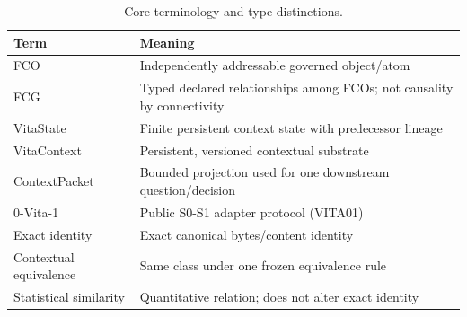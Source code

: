 \begin{table}[t]
\centering
\small
\begin{tabular}{ll}
\toprule
Term & Meaning \\
\midrule
FCO & Independently addressable governed object/atom \\
FCG & Typed declared relationships among FCOs; not causality by connectivity \\
VitaState & Finite persistent context state with predecessor lineage \\
VitaContext & Persistent, versioned contextual substrate \\
ContextPacket & Bounded projection used for one downstream question/decision \\
0-Vita-1 & Public S0-S1 adapter protocol (VITA01) \\
Exact identity & Exact canonical bytes/content identity \\
Contextual equivalence & Same class under one frozen equivalence rule \\
Statistical similarity & Quantitative relation; does not alter exact identity \\
\bottomrule
\end{tabular}
\caption{Core terminology and type distinctions.}
\label{tab:terms}
\end{table}
